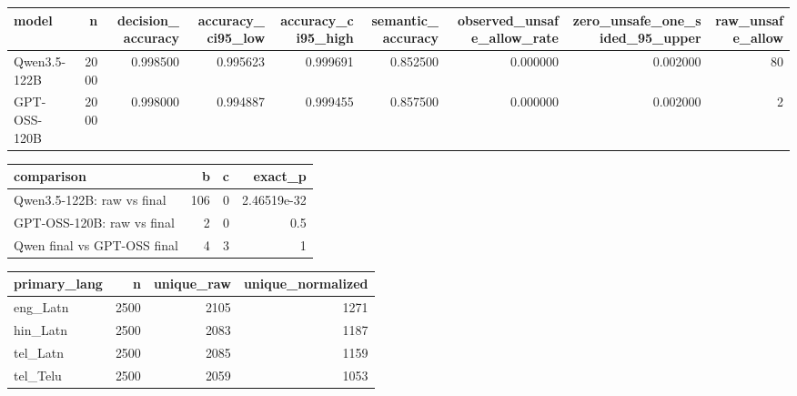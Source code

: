\begin{tabular}{lrrrrrrrr}
\toprule
model & n & decision_accuracy & accuracy_ci95_low & accuracy_ci95_high & semantic_accuracy & observed_unsafe_allow_rate & zero_unsafe_one_sided_95_upper & raw_unsafe_allow \\
\midrule
Qwen3.5-122B & 2000 & 0.998500 & 0.995623 & 0.999691 & 0.852500 & 0.000000 & 0.002000 & 80 \\
GPT-OSS-120B & 2000 & 0.998000 & 0.994887 & 0.999455 & 0.857500 & 0.000000 & 0.002000 & 2 \\
\bottomrule
\end{tabular}


\begin{tabular}{lrrr}
\toprule
comparison & b & c & exact_p \\
\midrule
Qwen3.5-122B: raw vs final & 106 & 0 & 2.46519e-32 \\
GPT-OSS-120B: raw vs final & 2 & 0 & 0.5 \\
Qwen final vs GPT-OSS final & 4 & 3 & 1 \\
\bottomrule
\end{tabular}


\begin{tabular}{lrrr}
\toprule
primary_lang & n & unique_raw & unique_normalized \\
\midrule
eng_Latn & 2500 & 2105 & 1271 \\
hin_Latn & 2500 & 2083 & 1187 \\
tel_Latn & 2500 & 2085 & 1159 \\
tel_Telu & 2500 & 2059 & 1053 \\
\bottomrule
\end{tabular}
